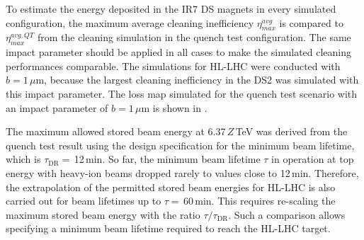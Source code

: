 To estimate the energy deposited in the IR7 DS magnets in every simulated configuration, the maximum average cleaning inefficiency $\eta^{avg}_{max}$ is compared to $\eta^{avg,QT}_{max}$ from the cleaning simulation in the quench test configuration. The same impact parameter should be applied in all cases to make the simulated cleaning performances comparable. The simulations for HL-LHC were conducted with $b=1\,\mu$m, because the largest cleaning inefficiency in the DS2 was simulated with this impact parameter. The loss map simulated for the quench test scenario with an impact parameter of $b=1\,\mu$m is shown in . 
\vspace{0.2cm}

The maximum allowed stored beam energy at 6.37$\,Z\,$TeV was derived from the quench test result using the design specification for the minimum beam lifetime, which is $\tau_\text{DR}=\,$12\,min. So far, the minimum beam lifetime $\tau$ in operation at top energy with heavy-ion beams dropped rarely to values close to 12\,min. Therefore, the extrapolation of the permitted stored beam energies for HL-LHC is also carried out for beam lifetimes up to $\tau=\,$60\,min. This requires re-scaling the maximum stored beam energy with the ratio $\tau/\tau_\text{DR}$. Such a comparison allows specifying a minimum beam lifetime required to reach the HL-LHC target.

